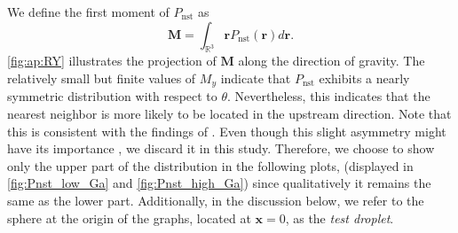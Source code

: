 We define the first moment of $P_\text{nst}$ as
\begin{equation}
 \textbf{M} = \int_{\mathbb{R}^3} \textbf{r} P_\text{nst}(\textbf{r}) d\textbf{r}.
\end{equation}
\ref{fig:ap:RY} illustrates the projection of $\textbf{M}$ along the direction of gravity. 
The relatively small but finite values of $M_y$ indicate that $P_\text{nst}$ exhibits a nearly symmetric distribution with respect to $\theta$.
Nevertheless, this indicates that the nearest neighbor is more likely to be located in the upstream direction. 
Note that this is consistent with the findings of \citet{zhang2023evolution}.
Even though this slight asymmetry might have its importance \cite{zhang2023evolution}, we discard it in this study. 
Therefore, we choose to show only the upper part of the distribution in the following plots, (displayed in \ref{fig:Pnst_low_Ga} and \ref{fig:Pnst_high_Ga}) since qualitatively it remains the same as the lower part.  
Additionally, in the discussion below, we refer to the sphere at the origin of the graphs, located at $\textbf{x}=0$, as the \textit{test droplet}.%

